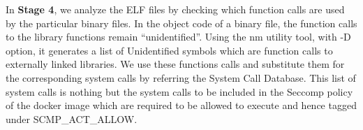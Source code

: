 In \textbf{Stage 4}, we analyze the ELF files by checking which function calls are used by the particular binary files. In the object code of a binary file, the function calls to the library functions remain “unidentified”. Using the nm utility tool, with -D option, it generates a list of Unidentified symbols which are function calls to externally linked libraries. We use these functions calls and substitute them for the corresponding system calls by referring the System Call Database. This list of system calls is nothing but the system calls to be included in the Seccomp policy of the docker image which are required to be allowed to execute and hence tagged under SCMP\_ACT\_ALLOW.



